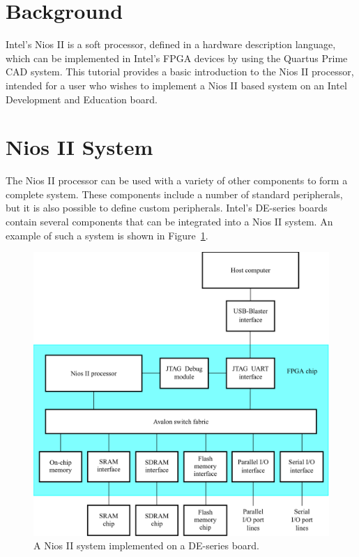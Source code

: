 \documentclass[11pt, twoside, pdftex]{article}
\begin{document}
\section{Background}

Intel's Nios II is a soft processor, defined in a hardware description language,
which can be implemented in Intel's FPGA devices by using the 
Quartus Prime CAD system. 
This tutorial provides a basic introduction to the Nios II processor, intended for
a user who wishes to implement a Nios II based system on an Intel Development and 
Education board.

\section{Nios II System}
The Nios II processor can be used with a variety of other components to form 
a complete system. These components include a number of standard peripherals, 
but it is also possible to define custom peripherals. Intel's DE-series boards
contain several components that can be integrated
into a Nios II system. An example of such a system is shown in Figure~\ref{fig:1}.
 
\begin{figure}[H]
   \begin{center}
      \includegraphics[scale=0.85]{figures/figure1.png}
   \caption{A Nios II system implemented on a DE-series board.} 
	 \label{fig:1}
	 \end{center}
\end{figure}
\end{document}
